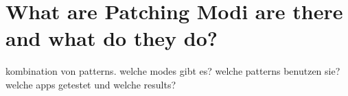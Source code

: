 \section{What are Patching Modi are there and what do they do?}\label{section:luckypatcher-modi}
kombination von patterns.\newline
welche modes gibt es? welche patterns benutzen sie?\newline
welche apps getestet und welche results?
